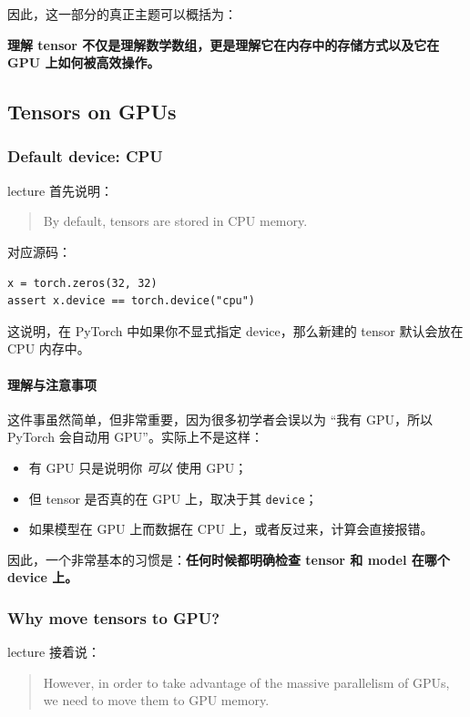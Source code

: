 \documentclass[a4paper,UTF8]{article}
\numberwithin{equation}{section}
\begin{document}
因此，这一部分的真正主题可以概括为：
\begin{center}
\textbf{理解 tensor 不仅是理解数学数组，更是理解它在内存中的存储方式以及它在 GPU 上如何被高效操作。}
\end{center}

\subsection{Tensors on GPUs}

\subsubsection{Default device: CPU}

lecture 首先说明：
\begin{quote}
By default, tensors are stored in CPU memory.
\end{quote}

对应源码：
\begin{verbatim}
x = torch.zeros(32, 32)
assert x.device == torch.device("cpu")
\end{verbatim}

这说明，在 PyTorch 中如果你不显式指定 device，那么新建的 tensor 默认会放在 CPU 内存中。

\paragraph{理解与注意事项}
这件事虽然简单，但非常重要，因为很多初学者会误以为 ``我有 GPU，所以 PyTorch 会自动用 GPU''。实际上不是这样：
\begin{itemize}
    \item 有 GPU 只是说明你 \emph{可以} 使用 GPU；
    \item 但 tensor 是否真的在 GPU 上，取决于其 \verb|device|；
    \item 如果模型在 GPU 上而数据在 CPU 上，或者反过来，计算会直接报错。
\end{itemize}

因此，一个非常基本的习惯是：\textbf{任何时候都明确检查 tensor 和 model 在哪个 device 上。}

\subsubsection{Why move tensors to GPU?}

lecture 接着说：
\begin{quote}
However, in order to take advantage of the massive parallelism of GPUs, we need to move them to GPU memory.
\end{quote}
\end{document}
